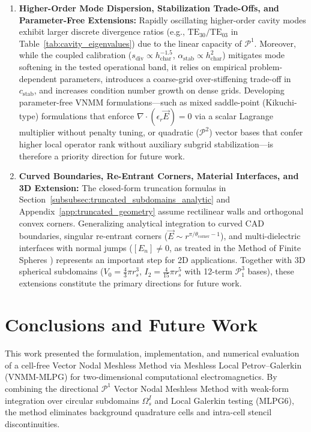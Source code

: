\documentclass[VANCOUVER,Times1COL]{WileyNJD-v5}
\begin{document}
\begin{enumerate}
    \item \textbf{Higher-Order Mode Dispersion, Stabilization Trade-Offs, and Parameter-Free Extensions:} Rapidly oscillating higher-order cavity modes exhibit larger discrete divergence ratios (e.g., $\mathrm{TE}_{30}/\mathrm{TE}_{03}$ in Table~\ref{tab:cavity_eigenvalues}) due to the linear capacity of $\mathcal{P}^1$. Moreover, while the coupled calibration ($s_{\mathrm{div}} \propto h_{\mathrm{char}}^{-1.5}$, $\alpha_{\mathrm{stab}} \propto h_{\mathrm{char}}^2$) mitigates mode softening in the tested operational band, it relies on empirical problem-dependent parameters, introduces a coarse-grid over-stiffening trade-off in $c_{\mathrm{stab}}$, and increases condition number growth on dense grids. Developing parameter-free VNMM formulations---such as mixed saddle-point (Kikuchi-type) formulations that enforce $\nabla \cdot (\epsilon_r \vec{E}) = 0$ via a scalar Lagrange multiplier without penalty tuning, or quadratic ($\mathcal{P}^2$) vector bases that confer higher local operator rank without auxiliary subgrid stabilization---is therefore a priority direction for future work.
    \item \textbf{Curved Boundaries, Re-Entrant Corners, Material Interfaces, and 3D Extension:} The closed-form truncation formulas in Section~\ref{subsubsec:truncated_subdomains_analytic} and Appendix~\ref{app:truncated_geometry} assume rectilinear walls and orthogonal convex corners. Generalizing analytical integration to curved CAD boundaries, singular re-entrant corners ($\vec{E} \sim r^{\pi/\theta_{\mathrm{corner}} - 1}$), and multi-dielectric interfaces with normal jumps ($[E_n] \ne 0$, as treated in the Method of Finite Spheres \cite{nicomedes2021acoustic}) represents an important step for 2D applications. Together with 3D spherical subdomains ($V_0 = \frac{4}{3}\pi r_s^3$, $I_2 = \frac{4}{15}\pi r_s^5$ with 12-term $\mathcal{P}_1^3$ bases), these extensions constitute the primary directions for future work.
\end{enumerate}

\section{Conclusions and Future Work}
\label{sec:conclusions}

This work presented the formulation, implementation, and numerical evaluation of a cell-free Vector Nodal Meshless Method via Meshless Local Petrov--Galerkin (VNMM-MLPG) for two-dimensional computational electromagnetics. By combining the directional $\mathcal{P}^1$ Vector Nodal Meshless Method with weak-form integration over circular subdomains $\Omega_s^I$ and Local Galerkin testing (MLPG6), the method eliminates background quadrature cells and intra-cell stencil discontinuities.
\end{document}
